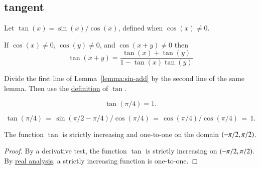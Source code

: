 \subsection{tangent}
\label{sec:tangent}

\begin{definition}[tangent]\label{def:tan}
Let $\tan(x) = \sin(x)/\cos(x)$, defined when $\cos(x)\ne0$.
%
%
\end{definition}


\begin{lemma}\label{lemma:tan-add}
    If $\cos(x)\ne 0$, $\cos(y)\ne 0$, and $\cos(x+y)\ne0$ then
    \begin{displaymath}\tan(x+y) = \frac{\tan(x) + \tan(y) }{ 1 - \tan(x)\tan(y)}\end{displaymath}
\end{lemma}
%

\begin{proved}
  Divide the first line of Lemma~\ref{lemma:sin-add} by the second
  line of the same lemma.  Then use the \hyperref[def:tan]{definition} of $\tan$.
\swallowed\end{proved}

\begin{lemma}\label{lemma:tan-pi4}
    \begin{displaymath}\tan(\pi/4) = 1.\end{displaymath}
\end{lemma}

\begin{proved}  
    \begin{displaymath}\tan(\pi/4) \hyperref[def:tan]{\,=\,} \sin(\pi/2-\pi/4)/\cos(\pi/4) 
    \hyperref[lemma:cos-sin]{\,=\,}
    \cos(\pi/4)/\cos(\pi/4) \hyperref[eqn:cospi2]{\,=\,} 1.\end{displaymath}
\swallowed\end{proved}

\begin{lemma}\label{lemma:tan-monotone}
The function $\tan$ is strictly increasing and one-to-one on the domain
$(-\pi/2,\pi/2)$.
\end{lemma}

\begin{proof} By a derivative test,
the function $\tan$ is strictly increasing on $(-\pi/2,\pi/2)$.
By \hyperref[back:analysis]{real analysis}, 
a strictly increasing function is one-to-one.
\end{proof}


